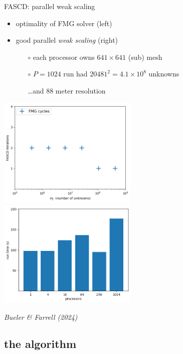 \documentclass[svgnames,
               hyperref={colorlinks,citecolor=DeepPink4,linkcolor=FireBrick,urlcolor=Maroon},
               usepdftitle=false]  %
               {beamer}
\begin{document}
\begin{frame}{FASCD: parallel weak scaling}

\begin{itemize}
\item optimality of FMG solver (left)
\item good parallel \emph{weak scaling} (right)
    \begin{itemize}
    \item[$\circ$] each processor owns $641\times 641$ (sub) mesh
    \item[$\circ$] $P=1024$ run had $20481^2=4.1\times 10^8$ unknowns
    \item[] \dots and 88 meter resolution
    \end{itemize}
\end{itemize}

\bigskip
\mbox{\includegraphics[width=0.5\textwidth]{figs/sia.png} \includegraphics[width=0.5\textwidth]{../talk-dms/figs/siaweaktime.png}}

\hfill \scriptsize
\emph{Bueler \& Farrell (2024)}
\end{frame}


\subsection{the algorithm}
\end{document}
